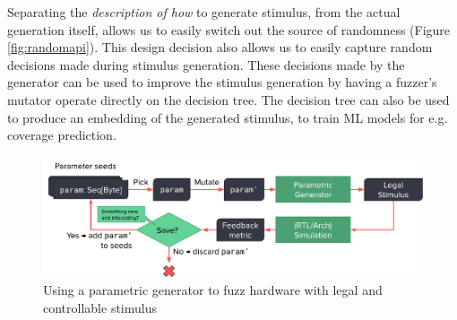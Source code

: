 \documentclass[sigplan,review,nonacm,9pt]{acmart}
\begin{document}
Separating the \textit{description of how} to generate stimulus, from the actual generation itself, allows us to easily switch out the source of randomness (Figure \ref{fig:randomapi}).
This design decision also allows us to easily capture random decisions made during stimulus generation.
These decisions made by the generator can be used to improve the stimulus generation by having a fuzzer's mutator operate directly on the decision tree.
The decision tree can also be used to produce an embedding of the generated stimulus, to train ML models for e.g. coverage prediction.

\begin{figure}
\includegraphics[width=\linewidth]{fuzzing/parametric_fuzzing_hw.pdf}
\caption{Using a parametric generator to fuzz hardware with legal and controllable stimulus}
\label{fig:parametric_fuzzing}
\end{figure}

%
%
\end{document}
